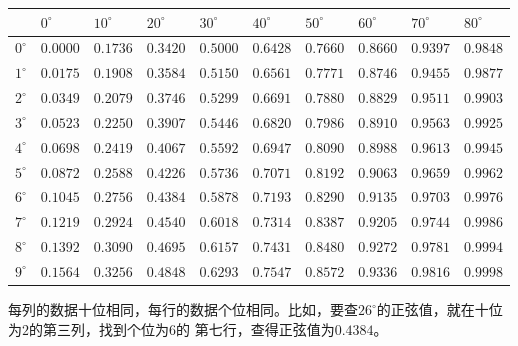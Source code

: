 \documentclass[12pt,UTF8]{ctexbook}
\begin{document}
\begin{center}
    \begin{tabular}{| p{1em}<{\centering} | p{2.4em}<{\centering} | p{2.4em}<{\centering} | p{2.4em}<{\centering} | p{2.4em}<{\centering} | p{2.4em}<{\centering} | p{2.4em}<{\centering} | p{2.4em}<{\centering} | p{2.4em}<{\centering} | p{2.4em}<{\centering} |}
        \hline
                  & $0^\circ$& $10^\circ$ & $20^\circ$ & $30^\circ$ & $40^\circ$ & $50^\circ$ & $60^\circ$ & $70^\circ$ & $80^\circ$ \\ [0.5ex] 
        \hline
        $0^\circ$ & $0.0000$ &  $0.1736$  &  $0.3420$  &  $0.5000$  &  $0.6428$  &  $0.7660$  &  $0.8660$  &  $0.9397$  &  $0.9848$  \\
        \hline
        $1^\circ$ & $0.0175$ &  $0.1908$  &  $0.3584$  &  $0.5150$  &  $0.6561$  &  $0.7771$  &  $0.8746$  &  $0.9455$  &  $0.9877$  \\
        \hline
        $2^\circ$ & $0.0349$ &  $0.2079$  &  $0.3746$  &  $0.5299$  &  $0.6691$  &  $0.7880$  &  $0.8829$  &  $0.9511$  &  $0.9903$  \\
        \hline
        $3^\circ$ & $0.0523$ &  $0.2250$  &  $0.3907$  &  $0.5446$  &  $0.6820$  &  $0.7986$  &  $0.8910$  &  $0.9563$  &  $0.9925$  \\
        \hline
        $4^\circ$ & $0.0698$ &  $0.2419$  &  $0.4067$  &  $0.5592$  &  $0.6947$  &  $0.8090$  &  $0.8988$  &  $0.9613$  &  $0.9945$  \\
        \hline
        $5^\circ$ & $0.0872$ &  $0.2588$  &  $0.4226$  &  $0.5736$  &  $0.7071$  &  $0.8192$  &  $0.9063$  &  $0.9659$  &  $0.9962$  \\
        \hline
        $6^\circ$ & $0.1045$ &  $0.2756$  &  $0.4384$  &  $0.5878$  &  $0.7193$  &  $0.8290$  &  $0.9135$  &  $0.9703$  &  $0.9976$  \\
        \hline
        $7^\circ$ & $0.1219$ &  $0.2924$  &  $0.4540$  &  $0.6018$  &  $0.7314$  &  $0.8387$  &  $0.9205$  &  $0.9744$  &  $0.9986$  \\
        \hline
        $8^\circ$ & $0.1392$ &  $0.3090$  &  $0.4695$  &  $0.6157$  &  $0.7431$  &  $0.8480$  &  $0.9272$  &  $0.9781$  &  $0.9994$  \\
        \hline
        $9^\circ$ & $0.1564$ &  $0.3256$  &  $0.4848$  &  $0.6293$  &  $0.7547$  &  $0.8572$  &  $0.9336$  &  $0.9816$  &  $0.9998$  \\
        \hline
    \end{tabular}
\end{center}
每列的数据十位相同，每行的数据个位相同。比如，要查$26^\circ$的正弦值，就在十位为$2$的第三列，找到个位为$6$的
第七行，查得正弦值为$0.4384$。
\end{document}
